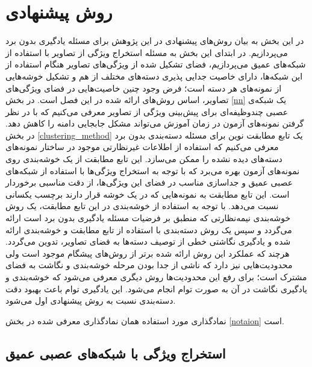\chapter{روش پیشنهادی} \label{chap:proposed}
در این بخش به بیان روش‌های پیشنهادی در این پژوهش برای مسئله یادگیری بدون برد می‌پردازیم.
در ابتدای این بخش به مسئله استخراج ویژگی از تصاویر با استفاده از شبکه‌های عمیق می‌پردازیم، فضای تشکیل شده از ویژگی‌های تصاویر هنگام استفاده از این شبکه‌ها، دارای خاصیت جدایی پذیری دسته‌های مختلف از هم و تشکیل خوشه‌هایی از نمونه‌های هر دسته است؛ فرض وجود چنین خاصیت‌هایی در فضای ویژگی‌های تصاویر، اساس روش‌های ارائه شده در این فصل است.
در بخش \ref{nn} یک شبکه‌ی عصبی چندوظیفه‌ای برای پیش‌بینی ویژگی از تصاویر معرفی می‌کنیم که با در نظر گرفتن نمونه‌های آزمون در زمان آموزش می‌تواند مشکل جابجایی دامنه را کاهش دهد.
در بخش 
\ref{clustering_method}
 یک تابع مطابقت نوین برای مسئله دسته‌بندی بدون برد معرفی می‌کنیم که استفاده از اطلاعات غیرنظارتی موجود در ساختار نمونه‌های دسته‌های دیده نشده را ممکن می‌سازد. این تابع مطابقت از یک خوشه‌بندی روی نمونه‌های آزمون بهره می‌برد که با توجه به استخراج ویژگی‌ها با استفاده از شبکه‌های عصبی عمیق و جداسازی مناسب در فضای این ویژگی‌ها، از دقت مناسبی برخوردار است. این تابع مطابقت به نمونه‌هایی که در یک خوشه قرار دارند برچسب یکسانی نسبت می‌دهد. با توجه به استفاده از خوشه‌بندی در این تابع مطابقت، یک روش خوشه‌بندی نیمه‌نظارتی که منطبق بر فرضیات مسئله یادگیری بدون برد است ارائه می‌گردد و سپس یک روش دسته‌بندی با استفاده از تابع مطابقت و خوشه‌بندی ارائه شده و یادگیری نگاشتی خطی از توصیف دسته‌ها به فضای تصاویر، تدوین می‌گردد. هرچند که عملکرد این روش ارائه شده برتر از روش‌های پیشگام موجود است ولی محدودیت‌هایی نیز دارد که ناشی از جدا بودن مرحله خوشه‌بندی و نگاشت به فضای مشترک است؛ برای رفع این محدودیت‌ها روش دیگری معرفی می‌شود که خوشه‌بندی و یادگیری نگاشت در آن به صورت توام انجام می‌شود. این یادگیری توام باعث بهبود دقت دسته‌بندی نسبت به روش پیشنهادی اول می‌شود.

نمادگذاری مورد استفاده همان نمادگذاری معرفی شده در بخش \ref{notaion} است.
\section{استخراج ویژگی با شبکه‌های عصبی عمیق}\label{cnns}

